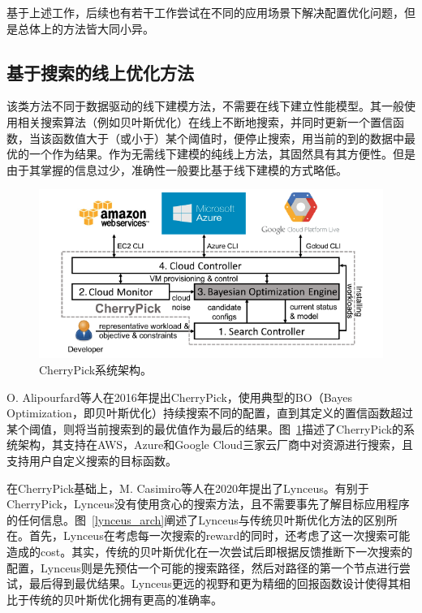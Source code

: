 基于上述工作，后续也有若干工作尝试在不同的应用场景下解决配置优化问题，但是总体上的方法皆大同小异。

\subsection{基于搜索的线上优化方法}
该类方法不同于数据驱动的线下建模方法，不需要在线下建立性能模型。其一般使用相关搜索算法（例如贝叶斯优化）在线上不断地搜索，并同时更新一个置信函数，当该函数值大于（或小于）某个阈值时，便停止搜索，用当前的到的数据中最优的一个作为结果。作为无需线下建模的纯线上方法，其固然具有其方便性。但是由于其掌握的信息过少，准确性一般要比基于线下建模的方式略低。

\begin{figure}[h]
    \centerline{\includegraphics[width=\textwidth]{figures/cherrypick-arch.png}}
    \caption{CherryPick系统架构。}
    \label{cherrypick_arch}
\end{figure}

O. Alipourfard等人在2016年提出CherryPick\parencite{alipourfard2017cherrypick}，使用典型的BO（Bayes Optimization，即贝叶斯优化）持续搜索不同的配置，直到其定义的置信函数超过某个阈值，则将当前搜索到的最优值作为最后的结果。图~\ref{cherrypick_arch}描述了CherryPick的系统架构，其支持在AWS，Azure和Google Cloud三家云厂商中对资源进行搜索，且支持用户自定义搜索的目标函数。

在CherryPick基础上，M. Casimiro等人在2020年提出了Lynceus\parencite{casimiro2019lynceus}。有别于CherryPick，Lynceus没有使用贪心的搜索方法，且不需要事先了解目标应用程序的任何信息。图~\ref{lynceus_arch}阐述了Lynceus与传统贝叶斯优化方法的区别所在。首先，Lynceus在考虑每一次搜索的reward的同时，还考虑了这一次搜索可能造成的cost。其实，传统的贝叶斯优化在一次尝试后即根据反馈推断下一次搜索的配置，Lynceus则是先预估一个可能的搜索路径，然后对路径的第一个节点进行尝试，最后得到最优结果。Lynceus更远的视野和更为精细的回报函数设计使得其相比于传统的贝叶斯优化拥有更高的准确率。

